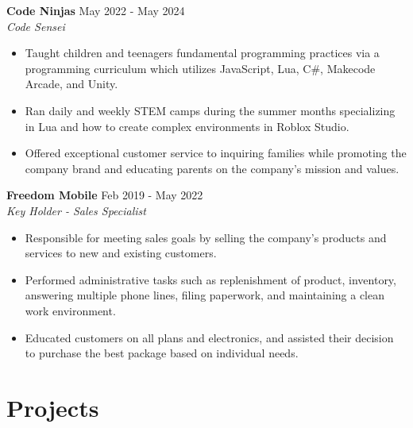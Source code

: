 \documentclass[letterpaper, 10pt]{article}
\newcommand{\bulletSpace}{\vspace{-4pt}}
\newcommand{\secStartSpace}{\vspace{3pt}}
\newcommand{\secEndSpace}{\vspace{5pt}}
\newcommand{\workHeader}[3]{
\noindent \large{\textbf{\textcolor{TextColor}{#1}}} \hfill \normalsize{#3}\vspace{2pt}\\
	\textit{#2}\vspace{-2pt}
}
\begin{document}
\begin{addmargin}[0.5em]{1em}
	\workHeader{Code Ninjas}{Code Sensei}{May 2022 - May 2024}
	\begin{itemize}
		\item Taught children and teenagers fundamental programming practices via a programming curriculum which utilizes JavaScript, Lua, C\#, Makecode Arcade, and Unity.
		      \bulletSpace
        \item Ran daily and weekly STEM camps during the summer months specializing in Lua and how to create complex environments in Roblox Studio.
			  \bulletspace
		\item Offered exceptional customer service to inquiring families while promoting the company brand and educating parents on the company's mission and values.
	\end{itemize}
		
	\workHeader{Freedom Mobile}{Key Holder - Sales Specialist}{Feb 2019 - May 2022}
	\begin{itemize}
		\item Responsible for meeting sales goals by selling the company's products and services to new and existing customers.
		      \bulletSpace
		\item Performed administrative tasks such as replenishment of product, inventory, answering multiple phone lines, filing paperwork, and maintaining a clean work environment.
			  \bulletSpace
		\item Educated customers on all plans and electronics, and assisted their decision to purchase the best package based on individual needs.
	\end{itemize}
\end{addmargin}
\secEndSpace



\section{\color{blue} \textbf{Projects}}
\secStartSpace
\end{document}
